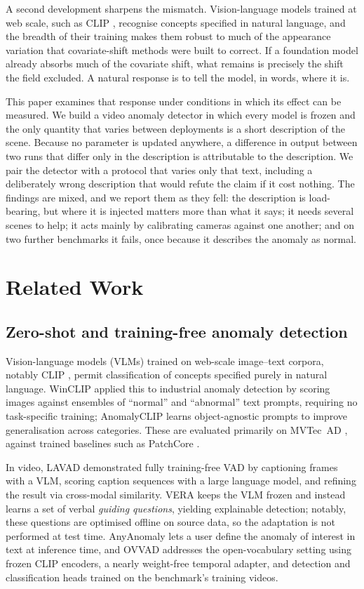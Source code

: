 \documentclass[a4paper,fleqn]{cas-sc}
\begin{document}
A second development sharpens the mismatch. Vision-language models trained at web
scale, such as CLIP \citep{radford2021clip}, recognise concepts specified in
natural language, and the breadth of their training makes them robust to much of
the appearance variation that covariate-shift methods were built to correct. If a
foundation model already absorbs much of the covariate shift, what remains is
precisely the shift the field excluded. A natural response is to tell the model, in
words, where it is.

This paper examines that response under conditions in which its effect can be
measured. We build a video anomaly detector in which every model is frozen and the
only quantity that varies between deployments is a short description of the scene.
Because no parameter is updated anywhere, a difference in output between two runs
that differ only in the description is attributable to the description. We pair the
detector with a protocol that varies only that text, including a deliberately wrong
description that would refute the claim if it cost nothing. The findings are mixed,
and we report them as they fell: the description is load-bearing, but where it is
injected matters more than what it says; it needs several scenes to help; it acts
mainly by calibrating cameras against one another; and on two further benchmarks it
fails, once because it describes the anomaly as normal.

\section{Related Work}
\label{sec:lit}
\subsection{Zero-shot and training-free anomaly detection}
Vision-language models (VLMs) trained on web-scale image--text corpora, notably
CLIP \citep{radford2021clip}, permit classification of concepts specified purely
in natural language. WinCLIP \citep{jeong2023winclip} applied this to industrial
anomaly detection by scoring images against ensembles of ``normal'' and
``abnormal'' text prompts, requiring no task-specific training; AnomalyCLIP
\citep{zhou2024anomalyclip} learns object-agnostic prompts to improve
generalisation across categories. These are evaluated primarily on MVTec~AD
\citep{bergmann2019mvtec}, against trained baselines such as PatchCore
\citep{roth2022patchcore}.

In video, LAVAD \citep{zanella2024lavad} demonstrated fully training-free VAD by
captioning frames with a VLM, scoring caption sequences with a large language
model, and refining the result via cross-modal similarity. VERA
\citep{ye2025vera} keeps the VLM frozen and instead learns a set of verbal
\emph{guiding questions}, yielding explainable detection; notably, these
questions are optimised offline on source data, so the adaptation is not
performed at test time. AnyAnomaly \citep{anyanomaly2025} lets a user define the
anomaly of interest in text at inference time, and OVVAD \citep{wu2024ovvad}
addresses the open-vocabulary setting using frozen CLIP encoders, a nearly
weight-free temporal adapter, and detection and classification heads trained
on the benchmark's training videos.
\end{document}
